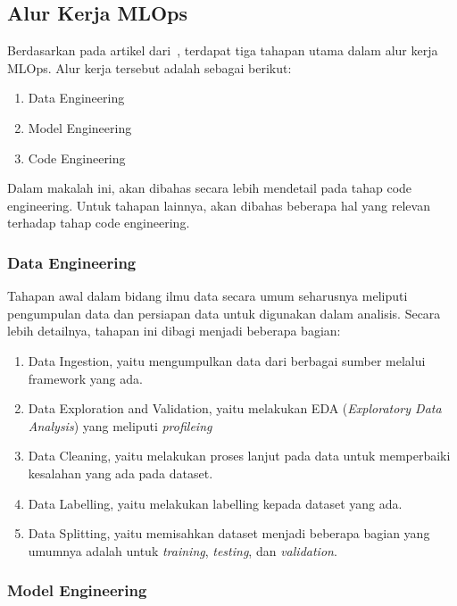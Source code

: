 
\subsection{Alur Kerja MLOps}

Berdasarkan pada artikel dari~\cite{mlopsorg}, terdapat tiga tahapan utama dalam alur kerja MLOps.
Alur kerja tersebut adalah sebagai berikut:
\begin{enumerate}
  \item Data Engineering
  \item Model Engineering
  \item Code Engineering
\end{enumerate}

Dalam makalah ini, akan dibahas secara lebih mendetail pada tahap code engineering.
Untuk tahapan lainnya, akan dibahas beberapa hal yang relevan terhadap tahap code engineering.

\subsubsection{Data Engineering}

Tahapan awal dalam bidang ilmu data secara umum seharusnya meliputi pengumpulan data dan persiapan data untuk digunakan dalam analisis.
Secara lebih detailnya, tahapan ini dibagi menjadi beberapa bagian:
\begin{enumerate}
  \item Data Ingestion, yaitu mengumpulkan data dari berbagai sumber melalui framework yang ada. 
  \item Data Exploration and Validation, yaitu melakukan EDA (\textit{Exploratory Data Analysis}) yang meliputi \textit{profileing}
  \item Data Cleaning, yaitu melakukan proses lanjut pada data untuk memperbaiki kesalahan yang ada pada dataset.
  \item Data Labelling, yaitu melakukan labelling kepada dataset yang ada.
  \item Data Splitting, yaitu memisahkan dataset menjadi beberapa bagian yang umumnya adalah untuk \textit{training}, \textit{testing}, dan \textit{validation}.
\end{enumerate}

\subsubsection{Model Engineering}

